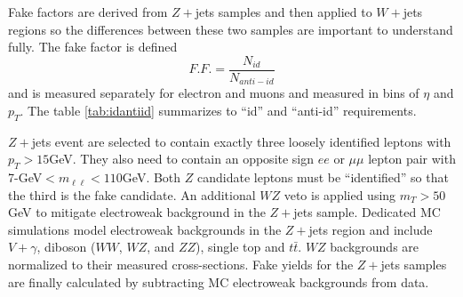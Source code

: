 Fake factors are derived from $Z+$jets samples and then applied to $W+$jets regions so the differences between these two samples are important to understand fully. The fake factor is defined 
\begin{equation}
F.F. = \frac{N_{id}}{N_{anti-id}}
\end{equation}
and is measured separately for electron and muons and measured in bins of $\eta$ and $p_T$. The table \ref{tab:idantiid} summarizes to ``id'' and ``anti-id'' requirements. 
\begin{table}[tb]
\caption{Requirements for ``identified'' and ``anti-identified'' electrons and muons.}
\label{tab:idantiid}
\end{table}
$Z+$jets event are selected to contain exactly three loosely identified leptons with $p_T>15$GeV. They also need to contain an opposite sign $ee$ or $\mu\mu$ lepton pair with 7-GeV$< m_{\ell\ell} < 110$GeV. Both $Z$ candidate leptons must be ``identified'' so that the third is the fake candidate. An additional $WZ$ veto is applied using $m_T>50$GeV to mitigate electroweak background in the $Z+$jets sample. Dedicated MC simulations model electroweak backgrounds in the $Z+$jets region and include $V+\gamma$, diboson ($WW$, $WZ$, and $ZZ$), single top and $t\bar{t}$. $WZ$ backgrounds are normalized to their measured cross-sections. Fake yields for the $Z+$jets samples are finally calculated by subtracting MC electroweak backgrounds from data. 

